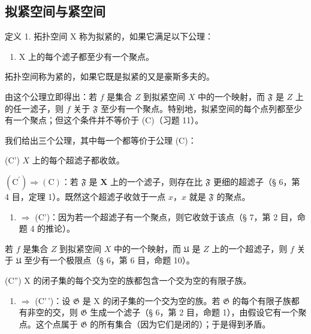 \subsection{拟紧空间与紧空间}

定义 1. 拓扑空间 X 称为拟紧的，如果它满足以下公理：

\begin{enumerate}
\def\labelenumi{(\Alph{enumi})}
\setcounter{enumi}{2}
\tightlist
\item
  X 上的每个滤子都至少有一个聚点。
\end{enumerate}

拓扑空间称为紧的，如果它既是拟紧的又是豪斯多夫的。

由这个公理立即得出：若 \(f\) 是集合 \(Z\) 到拟紧空间 \(X\) 中的一个映射，而 \(\mathfrak{F}\) 是 \(Z\) 上的任一滤子，则 \(f\) 关于 \(\mathfrak{F}\) 至少有一个聚点。特别地，拟紧空间的每个点列都至少有一个聚点；但这个条件并不等价于 (C)（习题 11）。

我们给出三个公理，其中每一个都等价于公理 (C)：

(C') \(X\) 上的每个超滤子都收敛。

\((\mathrm{C}^{\prime}) \Longrightarrow (\mathrm{C})\)：若 \(\mathfrak{F}\) 是 \(\mathbf{X}\) 上的一个滤子，则存在比 \(\mathfrak{F}\) 更细的超滤子（§ 6，第 4 目，定理 1）。既然这个超滤子收敛于一点 \(x\)，\(x\) 就是 \(\mathfrak{F}\) 的聚点。

\begin{enumerate}
\def\labelenumi{(\Alph{enumi})}
\setcounter{enumi}{2}
\tightlist
\item
  \(\Longrightarrow\) (C')：因为若一个超滤子有一个聚点，则它收敛于该点（§ 7，第 2 目，命题 4 的推论）。
\end{enumerate}

若 \(f\) 是集合 \(Z\) 到拟紧空间 \(X\) 中的一个映射，而 \(\mathfrak{U}\) 是 \(Z\) 上的一个超滤子，则 \(f\) 关于 \(\mathfrak{U}\) 至少有一个极限点（§ 6，第 6 目，命题 10）。

(C'') X 的闭子集的每个交为空的族都包含一个交为空的有限子族。

\begin{enumerate}
\def\labelenumi{(\Alph{enumi})}
\setcounter{enumi}{2}
\tightlist
\item
  \(\Longrightarrow\) (C'\,')：设 \(\mathfrak{G}\) 是 X 的闭子集的一个交为空的族。若 \(\mathfrak{G}\) 的每个有限子族都有非空的交，则 \(\mathfrak{G}\) 生成一个滤子（§ 6，第 2 目，命题 1），由假设它有一个聚点。这个点属于 \(\mathfrak{G}\) 的所有集合（因为它们是闭的）；于是得到矛盾。
\end{enumerate}

